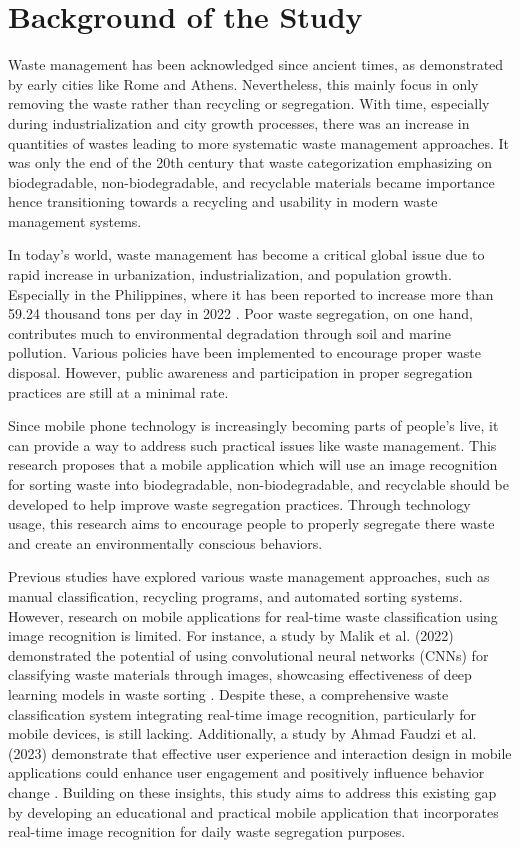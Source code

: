 \section{Background of the Study}
Waste management has been acknowledged since ancient times, as demonstrated by early cities like Rome and Athens. Nevertheless, this mainly focus in only removing the waste rather than recycling or segregation. With time, especially during industrialization and city growth processes, there was an increase in quantities of wastes leading to more systematic waste management approaches. It was only the end of the 20th century that waste categorization emphasizing on biodegradable, non-biodegradable, and recyclable materials became importance hence transitioning towards a recycling and usability in modern waste management systems.

In today's world, waste management has become a critical global issue due to rapid increase in urbanization, industrialization, and population growth. Especially in the Philippines, where it has been reported to increase more than 59.24 thousand tons per day in 2022 \parencite{Statista2022}. Poor waste segregation, on one hand, contributes much to environmental degradation through soil and marine pollution. Various policies have been implemented to encourage proper waste disposal. However, public awareness and participation in proper segregation practices are still at a minimal rate.

Since mobile phone technology is increasingly becoming parts of people's live, it can provide a way to address such practical issues like waste management. This research proposes that a mobile application which will use an image recognition for sorting waste into biodegradable, non-biodegradable, and recyclable should be developed to help improve waste segregation practices. Through technology usage, this research aims to encourage people to properly segregate there waste and create an environmentally conscious behaviors.

Previous studies have explored various waste management approaches, such as manual classification, recycling programs, and automated sorting systems. However, research on mobile applications for real-time waste classification using image recognition is limited. For instance, a study by Malik et al. (2022) demonstrated the potential of using convolutional neural networks (CNNs) for classifying waste materials through images, showcasing effectiveness of deep learning models in waste sorting \parencite{Malik2022}. Despite these, a comprehensive waste classification system integrating real-time image recognition, particularly for mobile devices, is still lacking. Additionally, a study by Ahmad Faudzi et al. (2023) demonstrate that effective user experience and interaction design in mobile applications could enhance user engagement and positively influence behavior change \parencite{AhmadFaudzi2023}. Building on these insights, this study aims to address this existing gap by developing an educational and practical mobile application that incorporates real-time image recognition for daily waste segregation purposes.